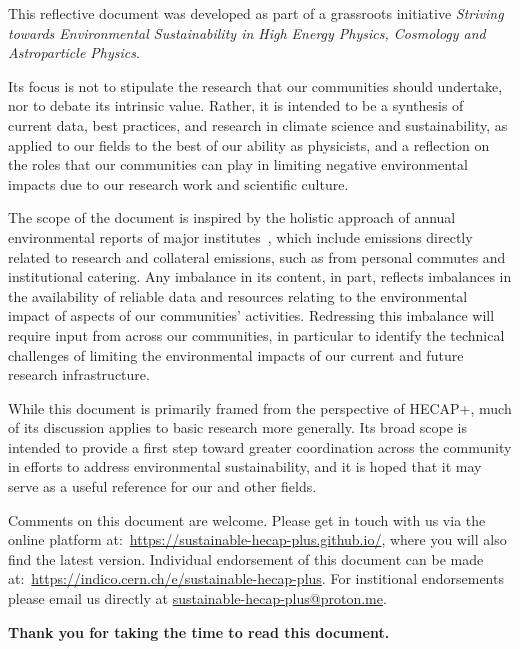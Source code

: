 \documentclass[../SustainableHEP.tex]{subfiles}
\begin{document}
        This reflective document was developed as part of a grassroots initiative {\it Striving towards Environmental Sustainability in High Energy Physics, Cosmology and Astroparticle Physics}.
        
        Its focus is not to stipulate the research that our communities should undertake, nor to debate its intrinsic value.  Rather, it is intended to be a synthesis of current data, best practices, and research in climate science and sustainability, as applied to our fields to the best of our ability as physicists, and a reflection on the roles that our communities can play in limiting negative environmental impacts due to our research work and scientific culture. 
        
        The scope of the document is inspired by the holistic approach of annual environmental reports of major institutes~\cite{Environment:2737239,FermilabEnvReport2019}, which include emissions directly related to research and collateral emissions, such as from personal commutes and institutional catering. Any imbalance in its content, in part, reflects imbalances in the availability of reliable data and resources relating to the environmental impact of aspects of our communities' activities.
        Redressing this imbalance will require input from across our communities, in particular to identify the technical challenges of limiting the environmental impacts of our current and future research infrastructure.

        While this document is primarily framed from the perspective of HECAP+, much of its discussion applies to basic research more generally. Its broad scope is intended to provide a first step toward greater coordination across the community in efforts to address environmental sustainability, and it is hoped that it may serve as a useful reference for our and other fields.
        
        Comments on this document are welcome. Please get in touch with us via the online platform at:~\url{https://sustainable-hecap-plus.github.io/}, where you will also find the latest version. Individual endorsement of this document can be made at:~\url{https://indico.cern.ch/e/sustainable-hecap-plus}.  For institional endorsements please email us directly at \href{mailto:sustainable-hecap-plus@proton.me}{sustainable-hecap-plus@proton.me}.
        
        \noindent \textbf{Thank you for taking the time to read this document.}
        
\end{document}
